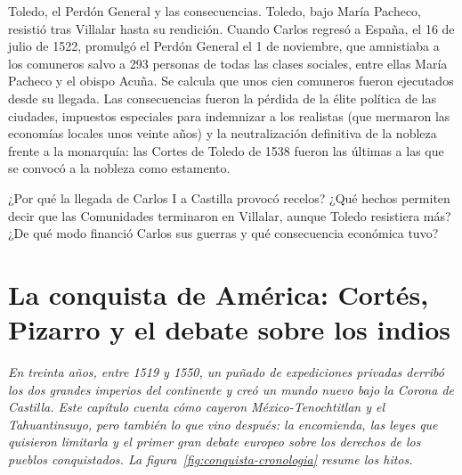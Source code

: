 \documentclass{book}
\begin{document}
\begin{tcolorbox}[title={Autoficha}, studiumcheck, breakable]

Toledo, el Perdón General y las consecuencias. Toledo, bajo María Pacheco, resistió tras Villalar hasta su rendición. Cuando Carlos regresó a España, el 16 de julio de 1522, promulgó el Perdón General el 1 de noviembre, que amnistiaba a los comuneros salvo a 293 personas de todas las clases sociales, entre ellas María Pacheco y el obispo Acuña. Se calcula que unos cien comuneros fueron ejecutados desde su llegada. Las consecuencias fueron la pérdida de la élite política de las ciudades, impuestos especiales para indemnizar a los realistas (que mermaron las economías locales unos veinte años) y la neutralización definitiva de la nobleza frente a la monarquía: las Cortes de Toledo de 1538 fueron las últimas a las que se convocó a la nobleza como estamento.


¿Por qué la llegada de Carlos I a Castilla provocó recelos? ¿Qué hechos permiten decir que las Comunidades terminaron en Villalar, aunque Toledo resistiera más? ¿De qué modo financió Carlos sus guerras y qué consecuencia económica tuvo?

\end{tcolorbox}

\chapter{La conquista de América: Cortés, Pizarro y el debate sobre los indios}
\label{chap:hist-07}

\noindent\textit{En treinta años, entre 1519 y 1550, un puñado de expediciones privadas derribó los dos grandes imperios del continente y creó un mundo nuevo bajo la Corona de Castilla. Este capítulo cuenta cómo cayeron México-Tenochtitlan y el Tahuantinsuyo, pero también lo que vino después: la encomienda, las leyes que quisieron limitarla y el primer gran debate europeo sobre los derechos de los pueblos conquistados. La figura~\ref{fig:conquista-cronologia} resume los hitos.}

\end{document}

